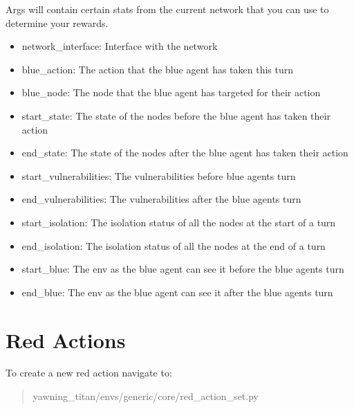 \documentclass[letterpaper,10pt,english]{sphinxmanual}
\begin{document}
\sphinxAtStartPar
Args will contain certain stats from the current network that you can
use to determine your rewards.
\begin{itemize}
\item {}
\sphinxAtStartPar
network\_interface: Interface with the network

\item {}
\sphinxAtStartPar
blue\_action: The action that the blue agent has taken this turn

\item {}
\sphinxAtStartPar
blue\_node: The node that the blue agent has targeted for their action

\item {}
\sphinxAtStartPar
start\_state: The state of the nodes before the blue agent has taken their action

\item {}
\sphinxAtStartPar
end\_state: The state of the nodes after the blue agent has taken their action

\item {}
\sphinxAtStartPar
start\_vulnerabilities: The vulnerabilities before blue agents turn

\item {}
\sphinxAtStartPar
end\_vulnerabilities: The vulnerabilities after the blue agents turn

\item {}
\sphinxAtStartPar
start\_isolation: The isolation status of all the nodes at the start of a turn

\item {}
\sphinxAtStartPar
end\_isolation: The isolation status of all the nodes at the end of a turn

\item {}
\sphinxAtStartPar
start\_blue: The env as the blue agent can see it before the blue agents turn

\item {}
\sphinxAtStartPar
end\_blue: The env as the blue agent can see it after the blue agents turn

\end{itemize}


\section{Red Actions}
\label{\detokenize{source/enhancing_yawning_titan:red-actions}}
\sphinxAtStartPar
To create a new red action navigate to:
\begin{quote}

\sphinxAtStartPar
yawning\_titan/envs/generic/core/red\_action\_set.py
\end{quote}
\end{document}
